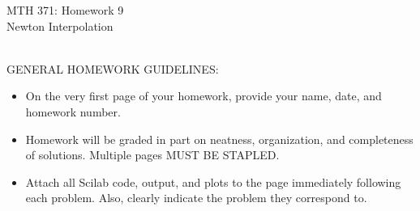 \documentclass[addpoints, 11pt]{exam}
\begin{document}
\vspace{100mm}
\begin{center} \Large
MTH 371: Homework 9 \\ Newton Interpolation \normalsize
\end{center}
\ \\
\noindent GENERAL HOMEWORK GUIDELINES: 
\begin{itemize}
\item On the very first page of your homework, provide your name, date, and homework number.\vspace{-2mm}
\item Homework will be graded in part on neatness, organization, and completeness of solutions. Multiple pages MUST BE STAPLED. \vspace{-2mm}
\item Attach all Scilab code, output, and plots to the page immediately following each problem. Also, clearly indicate the problem they correspond to.
\end{itemize}
\end{document}
